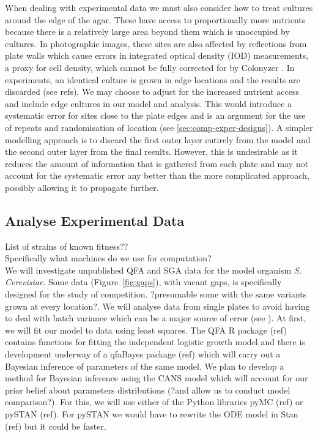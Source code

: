 When dealing with experimental data we must also consider how to treat
cultures around the edge of the agar. These have access to
proportionally more nutrients because there is a relatively large area
beyond them which is unoccupied by cultures. In photographic images,
these sites are also affected by reflections from plate walls which
cause errors in integrated optical density (IOD) measurements, a proxy
for cell density, which cannot be fully corrected for by Colonyzer
\citep{Lawless2010}. In experiments, an identical culture is grown in
edge locations and the results are discarded (see refs). We may choose
to adjust for the increased nutrient access and include edge cultures
in our model and analysis. This would introduce a systematic error for
sites close to the plate edges and is an argument for the use of
repeats and randomisation of location (see
\ref{sec:comp-exper-designs}). A simpler modelling approach is to
discard the first outer layer entirely from the model and the second
outer layer from the final results. However, this is undesirable as it
reduces the amount of information that is gathered from each plate and
may not account for the systematic error any better than the more
complicated approach, possibly allowing it to propagate further.

\subsection{Analyse Experimental Data}
\label{sec:analyse-data}

List of strains of known fitness??\\
Specifically what machines do we use for computation?\\

We will investigate unpublished QFA and SGA data for the model
organism \textit{S. Cerevisiae}. Some data (Figure~\ref{fig:gaps}),
with vacant gaps, is specifically designed for the study of
competition. ?presumable some with the same variants grown at every
location?. We will analyse data from single plates to avoid having to
deal with batch variance which can be a major source of error (see
\citet{Baryshnikova2010}). At first, we will fit our model to data
using least squares. The QFA R package (ref) contains functions for
fitting the independent logistic growth model and there is development
underway of a qfaBayes package (ref) which will carry out a Bayesian
inference of parameters of the same model. We plan to develop a method
for Bayesian inference using the CANS model which will account for our
prior belief about parameters distributions (?and allow us to conduct
model comparison?). For this, we will use either of the Python
libraries pyMC (ref) or pySTAN (ref). For pySTAN we would have to
rewrite the ODE model in Stan (ref) but it could be faster.

